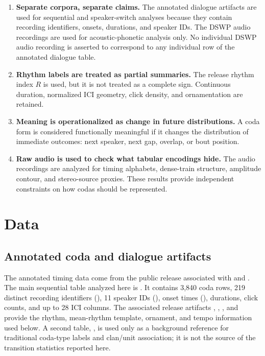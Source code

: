 \documentclass[11pt]{article}
\begin{document}
\begin{enumerate}
    \item \textbf{Separate corpora, separate claims.} The annotated dialogue artifacts are used for sequential and speaker-switch analyses because they contain recording identifiers, onsets, durations, and speaker IDs. The DSWP audio recordings are used for acoustic-phonetic analysis only. No individual DSWP audio recording is asserted to correspond to any individual row of the annotated dialogue table.
    \item \textbf{Rhythm labels are treated as partial summaries.} The release rhythm index $R$ is used, but it is not treated as a complete sign. Continuous duration, normalized ICI geometry, click density, and ornamentation are retained.
    \item \textbf{Meaning is operationalized as change in future distributions.} A coda form is considered functionally meaningful if it changes the distribution of immediate outcomes: next speaker, next gap, overlap, or bout position.
    \item \textbf{Raw audio is used to check what tabular encodings hide.} The audio recordings are analyzed for timing alphabets, dense-train structure, amplitude contour, and stereo-source proxies. These results provide independent constraints on how codas should be represented.
\end{enumerate}

\section{Data}

\subsection{Annotated coda and dialogue artifacts}

The annotated timing data come from the public release associated with \citet{sharma2024contextual} and  \citep{swcombinatoriality}. The main sequential table analyzed here is . It contains 3,840 coda rows, 219 distinct recording identifiers (), 11 speaker IDs (), onset times (), durations, click counts, and up to 28 ICI columns. The associated release artifacts , , , and  provide the rhythm, mean-rhythm template, ornament, and tempo information used below. A second table, , is used only as a background reference for traditional coda-type labels and clan/unit association; it is not the source of the transition statistics reported here.
\end{document}
